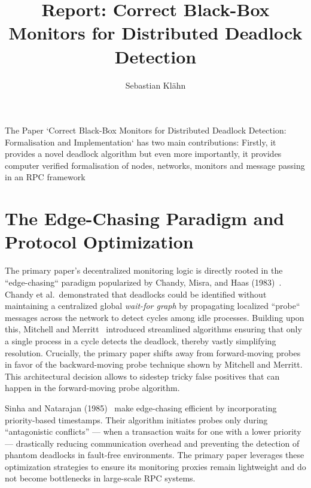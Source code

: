 \documentclass{llncs}
\begin{document}
\title{Report: Correct Black-Box Monitors for Distributed
Deadlock Detection}

\author{Sebastian Kl\"ahn}


\maketitle

The Paper `Correct Black-Box Monitors for Distributed Deadlock Detection: Formalisation and Implementation` has two main contributions: Firstly, it provides a novel deadlock algorithm but even more importantly, it provides computer verified formalisation of nodes, networks, monitors and message passing in an RPC framework


\section{The Edge-Chasing Paradigm and Protocol Optimization}
The primary paper's decentralized monitoring logic is directly rooted in
the ``edge-chasing`` paradigm popularized by Chandy, Misra, and Haas
(1983)~\cite{17deadlock_detection}. Chandy et al.\ demonstrated that
deadlocks could be identified without maintaining a centralized global
\emph{wait-for graph} by propagating localized ``probe`` messages across
the network to detect cycles among idle processes. Building upon this,
Mitchell and Merritt~\cite{44distributed} introduced streamlined
algorithms ensuring that only a single process in a cycle detects the
deadlock, thereby vastly simplifying resolution. Crucially, the primary
paper shifts away from forward-moving probes in favor of the
backward-moving probe technique shown by Mitchell and Merritt. This
architectural decision allows to sidestep tricky false positives
that can happen in the forward-moving probe algorithm.

Sinha and Natarajan (1985)~\cite{55priority} make edge-chasing efficient
by incorporating priority-based timestamps. Their algorithm initiates
probes only during ``antagonistic conflicts'' --- when a transaction
waits for one with a lower priority --- drastically reducing
communication overhead and preventing the detection of phantom deadlocks
in fault-free environments. The primary paper leverages these
optimization strategies to ensure its monitoring proxies remain
lightweight and do not become bottlenecks in large-scale RPC systems.
\end{document}
